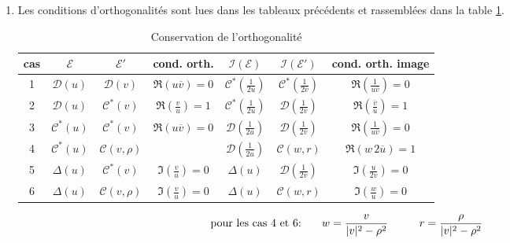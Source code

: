 \begin{enumerate}
\item Les conditions d'orthogonalités sont lues dans les tableaux précédents et rassemblées dans la table \ref{tab:consverorth}.
\begin{table}[h]
 \centering
 \renewcommand{\arraystretch}{2.5}
 \begin{tabular}{|c|c|c|c|c|c|c|}
\hline
cas & $\mathcal E$      & $\mathcal E'$        & cond. orth.                       & $\mathcal I (\mathcal{E})$              & $\mathcal I (\mathcal{E}')$             & cond. orth. image     \\ \hline
1   & $\mathcal D(u)$   & $\mathcal D(v)$      & $\Re\left(u\overline{v}\right)=0$ & $\mathcal C^*(\frac{1}{2\overline{u}})$ & $\mathcal C^*(\frac{1}{2\overline{v}})$ & $\Re\left( \frac{1}{u\overline{v}}\right)=0$ \\ \hline
2   & $\mathcal D(u)$   & $\mathcal C^*(v)$    & $\Re \left(\frac{v}{u}\right)=1$  & $\mathcal C^*(\frac{1}{2\overline{u}})$ & $\mathcal D(\frac{1}{2\overline{v}})$   & $\Re\left( \frac{\overline{v}}{\overline{u}}\right)=1$ \\ \hline
3   & $\mathcal C^*(u)$ & $\mathcal C^*(v)$    & $\Re\left(u\overline{v}\right)=0$ & $\mathcal D(\frac{1}{2\overline{u}})$   & $\mathcal D(\frac{1}{2\overline{v}})$   & $\Re\left( \frac{1}{u\overline{v}}\right)=0$ \\ \hline
4   & $\mathcal C^*(u)$ & $\mathcal C(v,\rho)$ &                                   & $\mathcal D(\frac{1}{2\overline{u}})$   & $\mathcal C(w,r)$           & $\Re\left(w \, 2\overline{u}\right)=1$\\ \hline
5   & $\Delta(u)$       & $\mathcal C^*(v)$    & $\Im\left( \frac{v}{u}\right) =0$ & $\Delta(u)$                             & $\mathcal D(\frac{1}{2\overline{v}})$   & $\Im\left( \frac{u}{2v}\right)=0$ \\ \hline
6   & $\Delta(u)$       & $\mathcal C(v,\rho)$ & $\Im\left(\frac{v}{u}\right) =0$  & $\Delta(u)$                             & $\mathcal C(w,r)$                       & $\Im\left(\frac{w}{u}\right) =0$ \\ \hline
\end{tabular}
 \caption{Conservation de l'orthogonalité}
 \label{tab:consverorth}
\end{table}
\begin{displaymath}
\text{pour les cas 4 et 6: }\hspace{0.5cm}  w = \frac{v}{|v|^2 - \rho^2} \hspace{1cm} r = \frac{\rho}{|v|^2 - \rho^2}
\end{displaymath}

\end{enumerate}
